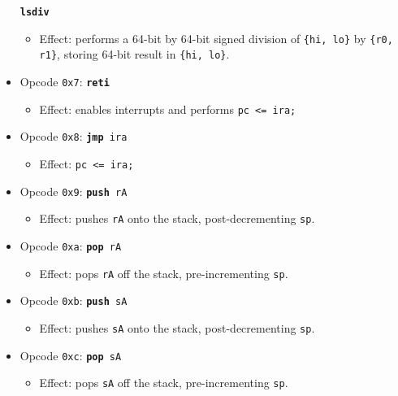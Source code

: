 \documentclass{article}
\begin{document}
\begin{itemize}
			\texttt{\textbf{lsdiv}}
		\begin{itemize}
			\item Effect:  performs a 64-bit by 64-bit signed division of
			\texttt{\{hi, lo\}} by \texttt{\{r0, r1\}}, storing 64-bit
			result in \texttt{\{hi, lo\}}.
		\end{itemize}
		\item Opcode \texttt{0x7}:
			\texttt{\textbf{reti}}
		\begin{itemize}
			\item Effect:  enables interrupts and performs
			\texttt{pc <= ira;}
		\end{itemize}
		\item Opcode \texttt{0x8}:
			\texttt{\textbf{jmp} ira}
		\begin{itemize}
			\item Effect:  \texttt{pc <= ira;}
		\end{itemize}
		\item Opcode \texttt{0x9}:
			\texttt{\textbf{push} rA}
		\begin{itemize}
			\item Effect:  pushes \texttt{rA} onto the stack,
			post-decrementing \texttt{sp}.
		\end{itemize}
		\item Opcode \texttt{0xa}:
			\texttt{\textbf{pop} rA}
		\begin{itemize}
			\item Effect:  pops \texttt{rA} off the stack,
			pre-incrementing \texttt{sp}.
		\end{itemize}
		\item Opcode \texttt{0xb}:
			\texttt{\textbf{push} sA}
		\begin{itemize}
			\item Effect:  pushes \texttt{sA} onto the stack,
			post-decrementing \texttt{sp}.
		\end{itemize}
		\item Opcode \texttt{0xc}:
			\texttt{\textbf{pop} sA}
		\begin{itemize}
			\item Effect:  pops \texttt{sA} off the stack,
			pre-incrementing \texttt{sp}.
		\end{itemize}
	\end{itemize}
	\doublespacing

\end{document}
